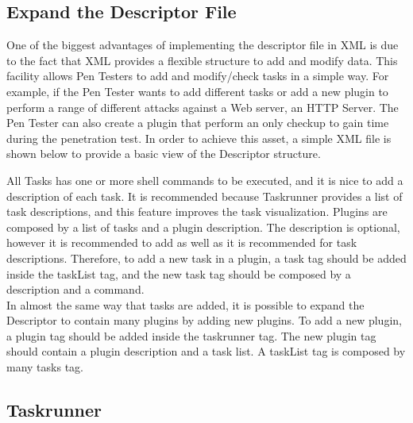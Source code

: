 \documentclass[a4paper, 12pt]{article}
\begin{document}
\subsection{Expand the Descriptor File}

	One of the biggest advantages of implementing the descriptor file in XML is due to the fact that XML provides a flexible structure to add and modify
data. This facility allows Pen Testers to add and modify/check tasks in a simple way. For example, if the Pen Tester wants to add different tasks or
add a new plugin to perform a range of different attacks against a Web server, an HTTP Server. The Pen Tester can also create a plugin that perform an
only checkup to gain time during the penetration test. In order to achieve this asset, a simple XML file is shown below to provide a basic view of the
Descriptor structure.\\

\clearpage



	All Tasks has one or more shell commands to be executed, and it is nice to add a description of each task. It is recommended because Taskrunner provides
a list of task descriptions, and this feature improves the task visualization. Plugins are composed by a list of tasks and a plugin description. The
description is optional, however it is recommended to add as well as it is recommended for task descriptions. Therefore, to add a new task in a plugin,
a task tag should be added inside the taskList tag, and the new task tag should be composed by a description and a command.\\

	In almost the same way that tasks are added, it is possible to expand the Descriptor to contain many plugins by adding new plugins. To add a new plugin,
a plugin tag should be added inside the taskrunner tag. The new plugin tag should contain a plugin description and a task list. A taskList tag is
composed by many tasks tag.\\

\subsection{Taskrunner}
\end{document}
